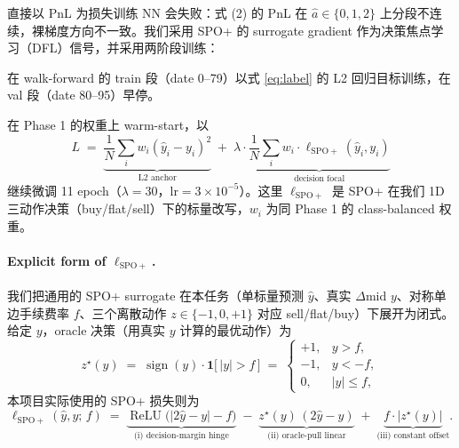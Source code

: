 \documentclass[11pt]{article}
\begin{document}
直接以 PnL 为损失训练 NN 会失败：式 (2) 的 PnL 在 $\hat a\in\{0,1,2\}$ 上分段不连续，裸梯度方向不一致。我们采用 SPO+ \cite{spo_plus} 的 surrogate gradient 作为决策焦点学习（DFL）信号，并采用两阶段训练：

\begin{description}[leftmargin=1.5em,style=nextline]
\item[Phase 1：L2 预训练] 在 walk-forward 的 train 段（date 0--79）以式 \eqref{eq:label} 的 L2 回归目标训练，在 val 段（date 80--95）早停。
\item[Phase 2：SPO+ DFL 微调] 在 Phase 1 的权重上 warm-start，以
\begin{equation}
\label{eq:dfl}
L \;=\; \underbrace{\frac{1}{N}\sum_i w_i (\hat y_i - y_i)^2}_{\text{L2 anchor}} \;+\; \lambda\cdot\underbrace{\frac{1}{N}\sum_i w_i\cdot\ell_{\mathrm{SPO+}}(\hat y_i, y_i)}_{\text{decision focal}}
\end{equation}
继续微调 11 epoch（$\lambda=30$，lr$=3\!\times\!10^{-5}$）。这里 $\ell_{\mathrm{SPO+}}$ 是 SPO+ 在我们 1D 三动作决策（buy/flat/sell）下的标量改写，$w_i$ 为同 Phase 1 的 class-balanced 权重。
\end{description}

\paragraph{Explicit form of $\ell_{\mathrm{SPO+}}$.}
我们把通用的 SPO+ surrogate \cite{spo_plus} 在本任务（单标量预测 $\hat y$、真实 $\Delta$mid $y$、对称单边手续费率 $f$、三个离散动作 $z\in\{-1,0,+1\}$ 对应 sell/flat/buy）下展开为闭式。给定 $y$，oracle 决策（用真实 $y$ 计算的最优动作）为
\begin{equation}
\label{eq:zstar}
z^{\star}(y) \;=\; \operatorname{sign}(y)\cdot\mathbf{1}\!\big[\,|y|>f\,\big]
\;=\;
\begin{cases} +1, & y > f,\\[-1pt] -1, & y < -f,\\[-1pt] 0, & |y|\le f,\end{cases}
\end{equation}
本项目实际使用的 SPO+ 损失则为
\begin{equation}
\label{eq:spop}
\ell_{\mathrm{SPO+}}(\hat y, y;\,f)
\;=\;
\underbrace{\operatorname{ReLU}\!\big(|2\hat y - y| - f\big)}_{\text{(i) decision-margin hinge}}
\;-\;
\underbrace{z^{\star}(y)\,(2\hat y - y)}_{\text{(ii) oracle-pull linear}}
\;+\;
\underbrace{f\cdot |z^{\star}(y)|}_{\text{(iii) constant offset}}.
\end{equation}
\end{document}

